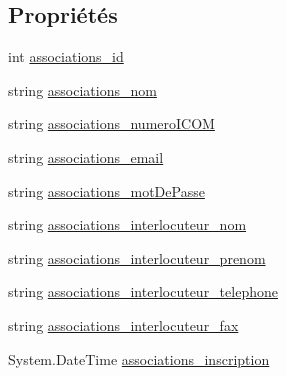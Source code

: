 \subsection*{Propriétés}
\begin{DoxyCompactItemize}
\item 
int \hyperlink{classforma_1_1formadb_data_set_1_1associations_row_aa4585da6025768e2e2054c54491b608a}{associations\+\_\+id}
\item 
string \hyperlink{classforma_1_1formadb_data_set_1_1associations_row_aa2cda58cac686161ac2590cfbe0f12a0}{associations\+\_\+nom}
\item 
string \hyperlink{classforma_1_1formadb_data_set_1_1associations_row_a0b65b34975301acfb0a04eb09785916f}{associations\+\_\+numero\+I\+C\+OM}
\item 
string \hyperlink{classforma_1_1formadb_data_set_1_1associations_row_ae61b300cc972f4373f766bcc7cd7d78b}{associations\+\_\+email}
\item 
string \hyperlink{classforma_1_1formadb_data_set_1_1associations_row_ab8db4129bd29ad9daf2fddef4e3984aa}{associations\+\_\+mot\+De\+Passe}
\item 
string \hyperlink{classforma_1_1formadb_data_set_1_1associations_row_ada3d4fb428ab82c599d10e4c08cc4f19}{associations\+\_\+interlocuteur\+\_\+nom}
\item 
string \hyperlink{classforma_1_1formadb_data_set_1_1associations_row_ac8f1eaa928b2290e62727066afca3e20}{associations\+\_\+interlocuteur\+\_\+prenom}
\item 
string \hyperlink{classforma_1_1formadb_data_set_1_1associations_row_aff2dfa1a73d64e75fd37145bbd2e84a7}{associations\+\_\+interlocuteur\+\_\+telephone}
\item 
string \hyperlink{classforma_1_1formadb_data_set_1_1associations_row_ab728c7ae2fee9fb2d27f2b6b3fd7f3f2}{associations\+\_\+interlocuteur\+\_\+fax}
\item 
System.\+Date\+Time \hyperlink{classforma_1_1formadb_data_set_1_1associations_row_a73588315dacf9570b543cee846fbb1f2}{associations\+\_\+inscription}
\end{DoxyCompactItemize}


